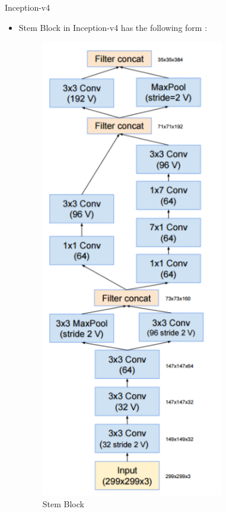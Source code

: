 \documentclass{beamer}
\begin{document}
\begin{frame}{Inception-v4}
	\begin{itemize}
		\item Stem Block in Inception-v4 has the following form :
		\vspace{7pt}
		\begin{figure}[h]		
			\centering
			\includegraphics[scale=0.37]{./v4/stem.PNG}
			\caption{Stem Block}
			\label{stem}
		\end{figure}
	\end{itemize}
\end{frame}
\end{document}
